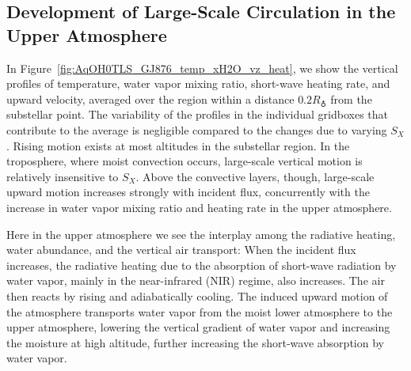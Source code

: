 \documentclass[11pt,numberedappendix,twocolappendix,]{emulateapj}
\def\wv{water vapor}
\begin{document}
\subsection{Development of Large-Scale Circulation in the Upper Atmosphere}
\label{ss:result_omega}

In Figure~\ref{fig:AqOH0TLS_GJ876_temp_xH2O_vz_heat}, we show the vertical profiles of temperature, \wv{} mixing ratio, short-wave heating rate, and upward velocity, averaged over the region within a distance $0.2R_\earth$ from the substellar point. 
The variability of the profiles in the individual gridboxes that contribute to the average is negligible compared to the changes due to varying $S_X$. 
%
Rising motion exists at most altitudes in the substellar region.  In the troposphere, where moist convection occurs, large-scale vertical motion is relatively insensitive to $S_X$.  Above the convective layers, though, large-scale upward motion increases strongly with incident flux, concurrently with the increase in \wv{} mixing ratio and heating rate in the upper atmosphere. 

\color{red}

Here in the upper atmosphere we see the interplay among the radiative heating, water abundance, and the vertical air transport:  
When the incident flux increases, the radiative heating due to the absorption of short-wave radiation by \wv{}, mainly in the near-infrared (NIR) regime, also increases. 
The air then reacts by rising and adiabatically cooling. 
The induced upward motion of the atmosphere transports water vapor from the moist lower atmosphere to the upper atmosphere, lowering the vertical gradient of water vapor and increasing the moisture at high altitude, further increasing the short-wave absorption by \wv{}. 
\end{document}
